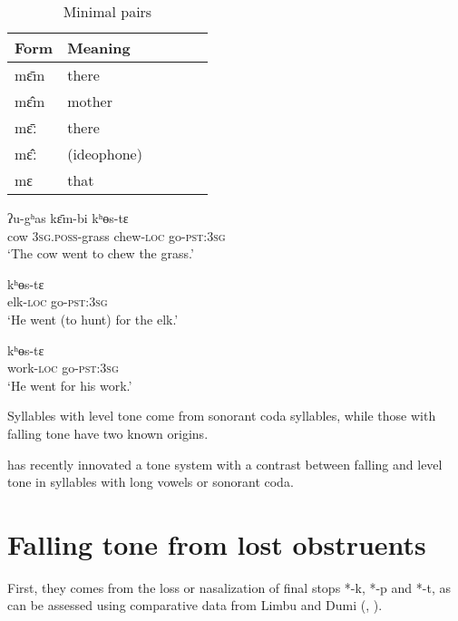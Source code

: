 \documentclass[oldfontcommands,oneside,a4paper,11pt]{article}
\newcommand{\ipa}[1]{{\phon \mbox{#1}}} %
\begin{document}
\begin{table}
\caption{Minimal pairs} \label{tab:minimal.pairs}\centering
\begin{tabular}{llllll}
\toprule
Form & Meaning\\
\midrule
\ipa{mɛ̄m} & there\\
\ipa{mɛ̂m} & mother\\
\ipa{mɛ̄ː} & there\\
\ipa{mɛ̂ː} & (ideophone) \\
\ipa{mɛ} & that\\
\bottomrule
\end{tabular}
\end{table}

\begin{exe}
\ex \label{ex:cow}
\gll \ipa{bʌ̂j} \ipa{ʔu-gʰas} \ipa{kɛ̄m-bi} \ipa{kʰɵs-tɛ}  \\
cow \textsc{3sg.poss}-grass chew-\textsc{loc} go-\textsc{pst:3sg} \\
\glt `The cow went to chew the grass.'
\end{exe}


\begin{exe}
\ex \label{ex:elk}
\gll   \ipa{kɛ̂m-bi} \ipa{kʰɵs-tɛ}  \\
elk-\textsc{loc} go-\textsc{pst:3sg} \\
\glt `He went (to hunt) for the elk.'
\end{exe}

\begin{exe}
\ex \label{ex:work}
\gll   \ipa{kɛ̀m-bi} \ipa{kʰɵs-tɛ}  \\
work-\textsc{loc} go-\textsc{pst:3sg} \\
\glt `He went for his work.'
\end{exe}






Syllables with level tone come from sonorant coda syllables, while those with falling tone have two known origins. 

has recently innovated a tone system with a contrast between falling and level tone in syllables with long vowels or sonorant coda.  

\section{Falling tone from lost obstruents} \label{sec:obstruents}
First, they comes from the loss or nasalization of final stops *-k, *-p and *-t, as can be assessed using comparative data from Limbu and Dumi (\citealt{driem93dumi}, \citealt{michailovsky02dico}).
\end{document}
